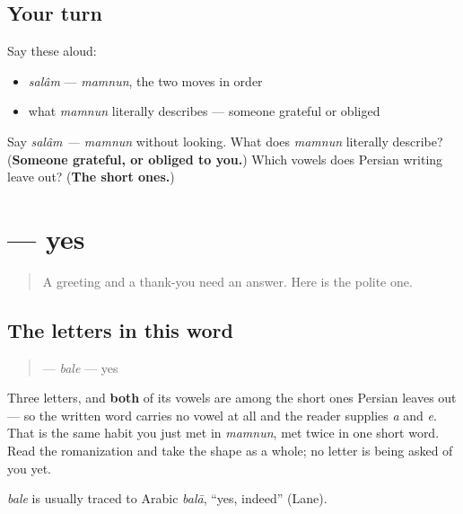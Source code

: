 \subsection*{Your turn}
Say these aloud:

\begin{itemize}
\raggedright
  \item \emph{salâm} — \emph{mamnun}, the two moves in order
  \item what \emph{mamnun} literally describes — someone grateful or obliged
\end{itemize}

\begin{tcolorbox}[breakable,colback=teal!4,colframe=teal!35!black,title={Before you move on}]
Say \emph{salâm — mamnun} without looking. What does \emph{mamnun} literally describe? (\textbf{Someone grateful, or obliged to you.}) Which vowels does Persian writing leave out? (\textbf{The short ones.})
\end{tcolorbox}
\section[\texorpdfstring{\fa{بله} (bale)}{بله (bale)}]{ — yes}

\label{lesson:FA-C01-bale}



\begin{quote}
A greeting and a thank-you need an answer. Here is the polite one.
\end{quote}

\subsection*{The letters in this word}
\begin{quote}
\textbf{} — \emph{bale} — yes
\end{quote}

Three letters, and \textbf{both} of its vowels are among the short ones Persian leaves out — so the written word carries no vowel at all and the reader supplies \emph{a} and \emph{e}. That is the same habit you just met in \emph{mamnun}, met twice in one short word. Read the romanization and take the shape as a whole; no letter is being asked of you yet.

\begin{cousinweb}
\emph{bale} is usually traced to Arabic \emph{balā}, \textquotedblleft{}yes, indeed\textquotedblright{} (Lane).
\end{cousinweb}

